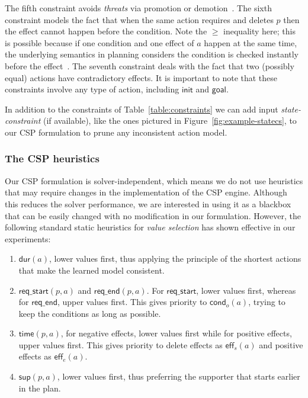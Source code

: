 \documentclass{ecai}
\newcommand{\eff}{\mathsf{eff}}    %
\newcommand{\cond}{\mathsf{cond}}  %
\newcommand{\dur}{\mathsf{dur}}    %
\newcommand{\supp}{\mathsf{sup}}   %
\newcommand{\tim}{\mathsf{time}}   %
\newcommand{\reqs}{\mathsf{req\_{start}}} %
\newcommand{\reqe}{\mathsf{req\_{end}}}   %
\newcommand{\ini}{\mathsf{init}}   %
\newcommand{\goal}{\mathsf{goal}}  %
\begin{document}
The fifth constraint avoids {\em threats} via promotion or demotion~\cite{ghallab2004automated}. The sixth constraint models the fact that when the same action requires and deletes $p$ then the effect cannot happen before the condition. Note the $\geq$ inequality here; this is possible because if one condition and one effect of $a$ happen at the same time, the underlying semantics in planning considers the condition is checked instantly before the effect~\cite{fox2003pddl2}. The seventh constraint deals with the fact that two (possibly equal) actions have contradictory effects. It is important to note that these constraints involve any type of action, including $\ini$ and $\goal$.

In addition to the constraints of Table~\ref{table:constraints} we can add input {\em state-constraint} (if available), like the ones pictured in Figure~\ref{fig:example-statecs}, to our CSP formulation to prune any inconsistent action model.

\subsubsection{The CSP heuristics}
\label{sec:implementation}
Our CSP formulation is solver-independent, which means we do not use heuristics that may require changes in the implementation of the CSP engine. Although this reduces the solver performance, we are interested in using it as a blackbox that can be easily changed with no modification in our formulation. However, the following standard static heuristics for {\em value selection} has shown effective in our experiments:
\begin{enumerate}
\item $\dur(a)$, lower values first, thus applying the principle of the shortest actions that make the learned model consistent.
\item $\reqs(p,a)$ and $\reqe(p,a)$. For $\reqs$, lower values first, whereas for $\reqe$, upper values first. This gives priority to $\cond_o(a)$, trying to keep the conditions as long as possible.  
\item $\tim(p,a)$, for negative effects, lower values first while for positive effects, upper values first. This gives priority to delete effects as $\eff_s(a)$ and positive effects as $\eff_e(a)$. 
\item $\supp(p,a)$, lower values first, thus preferring the supporter that starts earlier in the plan.
\end{enumerate}
\end{document}
